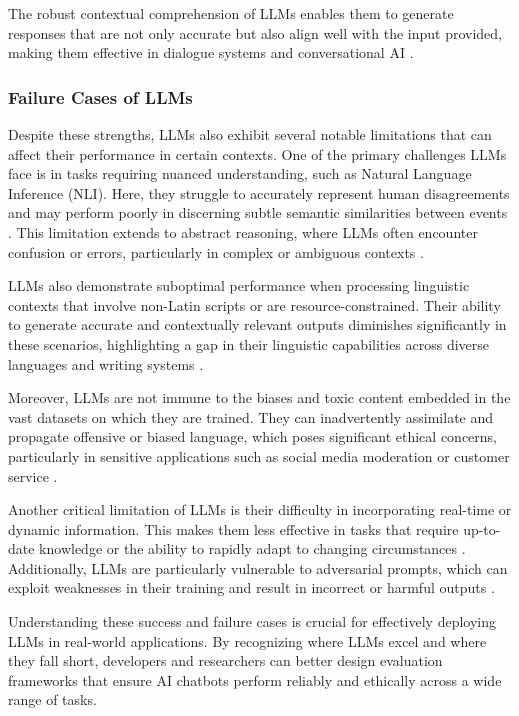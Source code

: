 The robust contextual comprehension of LLMs enables them to generate responses that are not only accurate but also align well with the input provided, making them effective in dialogue systems and conversational AI .

\subsubsection{Failure Cases of LLMs}

Despite these strengths, LLMs also exhibit several notable limitations that can affect their performance in certain contexts. One of the primary challenges LLMs face is in tasks requiring nuanced understanding, such as Natural Language Inference (NLI). Here, they struggle to accurately represent human disagreements and may perform poorly in discerning subtle semantic similarities between events  . This limitation extends to abstract reasoning, where LLMs often encounter confusion or errors, particularly in complex or ambiguous contexts  .

LLMs also demonstrate suboptimal performance when processing linguistic contexts that involve non-Latin scripts or are resource-constrained. Their ability to generate accurate and contextually relevant outputs diminishes significantly in these scenarios, highlighting a gap in their linguistic capabilities across diverse languages and writing systems  .

Moreover, LLMs are not immune to the biases and toxic content embedded in the vast datasets on which they are trained. They can inadvertently assimilate and propagate offensive or biased language, which poses significant ethical concerns, particularly in sensitive applications such as social media moderation or customer service  .

Another critical limitation of LLMs is their difficulty in incorporating real-time or dynamic information. This makes them less effective in tasks that require up-to-date knowledge or the ability to rapidly adapt to changing circumstances . Additionally, LLMs are particularly vulnerable to adversarial prompts, which can exploit weaknesses in their training and result in incorrect or harmful outputs .

Understanding these success and failure cases is crucial for effectively deploying LLMs in real-world applications. By recognizing where LLMs excel and where they fall short, developers and researchers can better design evaluation frameworks that ensure AI chatbots perform reliably and ethically across a wide range of tasks.

